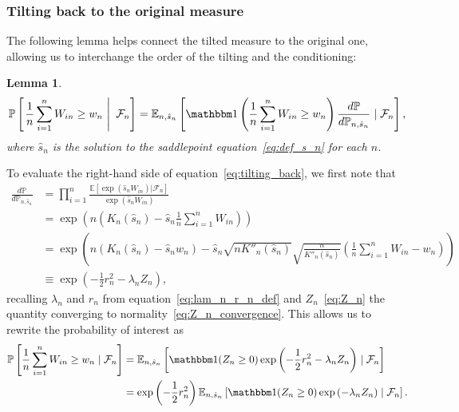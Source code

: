 \documentclass[12pt]{article}
\newtheorem{lemma}{Lemma}
\theoremstyle{definition}
\def\P{\mathbb{P}}
\def\P{\mathbb{P}}
\newcommand{\E}{\mathbb E}								%
\renewcommand{\P}{\mathbb{P}}							%
\newcommand{\indicator}{\mathbbm 1}						%
\begin{document}
\subsubsection{Tilting back to the original measure}

The following lemma helps connect the tilted measure to the original one, allowing us to interchange the order of the tilting and the conditioning:
\begin{lemma} \label{lem:tilting_back}
\begin{equation}
\P\left[\left.\frac{1}{n}\sum_{i = 1}^n W_{in} \geq w_n\ \right|\ \mathcal{F}_n\right] = \E_{n, \hat s_n}\left[\indicator\left(\frac{1}{n}\sum_{i = 1}^n W_{in} \geq w_n\right)\frac{d\P}{d\P_{n, \hat s_n}} \mid \mathcal{F}_n\right], \label{eq:tilting_back}
\end{equation} 
where $\hat s_n$ is the solution to the saddlepoint equation~\eqref{eq:def_s_n} for each $n$.
\end{lemma}
\noindent To evaluate the right-hand side of equation~\eqref{eq:tilting_back}, we first note that
\begin{equation*}
\begin{split}
\frac{d\P}{d\P_{n, \hat s_n}} &= \prod_{i = 1}^n \frac{\E[\exp(\hat s_n W_{in})|\mathcal F_n]}{\exp(\hat s_n W_{in})} \\
&= \exp\left(n\left(K_n(\hat s_n) - \hat s_n \frac{1}{n}\sum_{i = 1}^n W_{in}\right)\right) \\
&= \exp\left(n(K_n(\hat s_n) - \hat s_n w_n) - \hat s_n \sqrt{nK''_n(\hat s_n)} \sqrt{\frac{n}{K''_n(\hat s_n)}} \left(\frac{1}{n}\sum_{i = 1}^n W_{in} - w_n\right)\right) \\
&\equiv \exp\left(-\frac12 r_n^2 - \lambda_n Z_n \right),
\end{split}
\end{equation*}
recalling $\lambda_n$ and $r_n$ from equation~\eqref{eq:lam_n_r_n_def} and $Z_n$~\eqref{eq:Z_n} the quantity converging to normality~\eqref{eq:Z_n_convergence}. This allows us to rewrite the probability of interest as
\begin{equation}
\begin{split}
\P\left[\frac1n \sum_{i = 1}^n W_{in} \geq w_n \mid \mathcal F_n\right] &= \E_{n, \hat s_n}\left[\indicator(Z_n \geq 0)\exp\left(-\frac12 r_n^2 - \lambda_n Z_n \right) \mid \mathcal F_n\right] \\
&= \exp\left(-\frac12 r_n^2\right)\E_{n, \hat s_n}\left[\indicator(Z_n \geq 0)\exp\left(-\lambda_n Z_n \right) \mid \mathcal F_n\right].
\end{split}
\end{equation}
\end{document}

